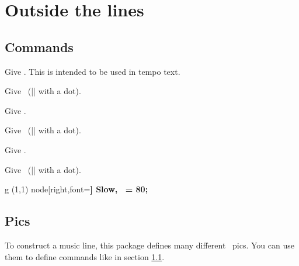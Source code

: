 \section{Outside the lines}\label{sec:out}
\subsection{Commands}\label{sec:out:cmd}
\begin{command}{\tmlittlehalf{}}
  Give \tmlittlehalf. This is intended to be used in tempo text.
\end{command}
\begin{command}{\tmlittlehalfdot{}}
  Give \tmlittlehalfdot\ (|\tmlittlehalf| with a dot).
\end{command}
\begin{command}{\tmlittlequarter{}}
  Give \tmlittlequarter.
\end{command}
\begin{command}{\tmlittlequarterdot{}}
  Give \tmlittlequarterdot\ (|\tmlittlequarter| with a dot).
\end{command}
\begin{command}{\tmlittleeighth{}}
  Give \tmlittleeighth.
\end{command}
\begin{command}{\tmlittleeighthdot{}}
  Give \tmlittleeighthdot\ (|\tmlittleeighth| with a dot).
\end{command}
\begin{codeexample}[]
\begin{tmline}
\begin{tmstaff}{g}{}
  \path (1,1) node[right,font=\bfseries] {Slow, \tmlittleeighthdot[red]\ = 80};
\end{tmstaff}
\end{tmline}
\end{codeexample}
\subsection{Pics}\label{sec:out:pic}
To construct a music line, this package defines many different \tikzname\ pics. 
You can use them to define commands like in section \ref{sec:out:cmd}.
